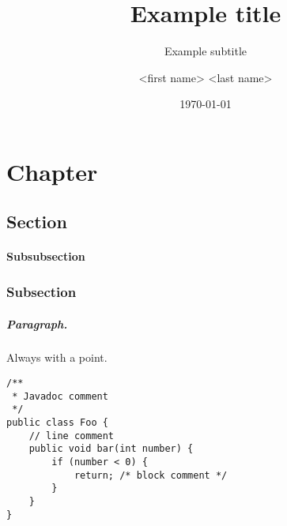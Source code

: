 \documentclass{seal_thesis}
\date{\today}
\title{Example title}
\subtitle{Example subtitle}
\author{<first name> <last name>}
\begin{document}
\maketitle

\frontmatter

\begin{acknowledgements}
\end{acknowledgements}

\begin{abstract}
\end{abstract}

\begin{zusammenfassung}
\end{zusammenfassung}

\tableofcontents
\listoffigures
\listoftables
\lstlistoflistings

\mainmatter
\chapter{Chapter}
\section{Section}
%
\subsubsection{Subsubsection}

\subsection{Subsection}
%
\paragraph{Paragraph.} Always with a point.

\begin{lstlisting}[caption=An example code snippet]
/**
 * Javadoc comment
 */
public class Foo {
	// line comment
	public void bar(int number) {
		if (number < 0) {
			return; /* block comment */
		}
	}
}
\end{lstlisting}

\backmatter


\end{document}
